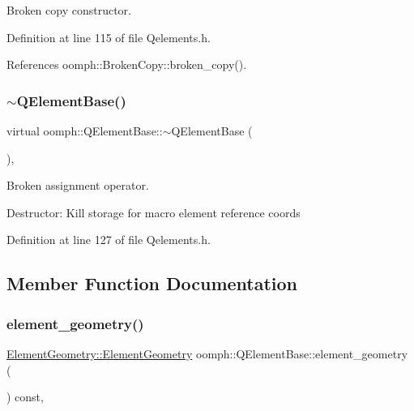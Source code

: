 Broken copy constructor. 



Definition at line 115 of file Qelements.\+h.



References oomph\+::\+Broken\+Copy\+::broken\+\_\+copy().

\mbox{\label{classoomph_1_1QElementBase_af280c893096d9635027d57ff49521fb2}} 
\subsubsection{\texorpdfstring{$\sim$\+Q\+Element\+Base()}{~QElementBase()}}
{\footnotesize\ttfamily virtual oomph\+::\+Q\+Element\+Base\+::$\sim$\+Q\+Element\+Base (\begin{DoxyParamCaption}{ }\end{DoxyParamCaption})\hspace{0.3cm}{\ttfamily [inline]}, {\ttfamily [virtual]}}



Broken assignment operator. 

Destructor\+: Kill storage for macro element reference coords 

Definition at line 127 of file Qelements.\+h.



\subsection{Member Function Documentation}
\mbox{\label{classoomph_1_1QElementBase_a3e802dea8060d1b95c2fe505e0b0df1f}} 
\subsubsection{\texorpdfstring{element\+\_\+geometry()}{element\_geometry()}}
{\footnotesize\ttfamily \hyperlink{namespaceoomph_1_1ElementGeometry_a86ff99972b0205d7524e294c58c1182a}{Element\+Geometry\+::\+Element\+Geometry} oomph\+::\+Q\+Element\+Base\+::element\+\_\+geometry (\begin{DoxyParamCaption}{ }\end{DoxyParamCaption}) const\hspace{0.3cm}{\ttfamily [inline]}, {\ttfamily [virtual]}}



